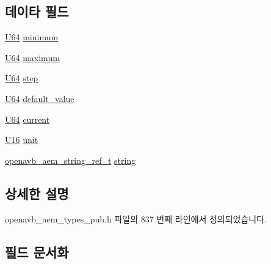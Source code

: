 \subsection*{데이타 필드}
\begin{DoxyCompactItemize}
\item 
\hyperlink{openavb__types__base__pub_8h_a25809e0734a149248fcf5831efa4e33d}{U64} \hyperlink{structopenavb__aem__control__value__format__control__linear__uint64__t_a6606c20ee2118944a8ad410a0dac9f76}{minimum}
\item 
\hyperlink{openavb__types__base__pub_8h_a25809e0734a149248fcf5831efa4e33d}{U64} \hyperlink{structopenavb__aem__control__value__format__control__linear__uint64__t_a8fe7f7213e1dad678ecc8a97fc7b7aaf}{maximum}
\item 
\hyperlink{openavb__types__base__pub_8h_a25809e0734a149248fcf5831efa4e33d}{U64} \hyperlink{structopenavb__aem__control__value__format__control__linear__uint64__t_a191ad24e14f917bbfd56d08146095b3e}{step}
\item 
\hyperlink{openavb__types__base__pub_8h_a25809e0734a149248fcf5831efa4e33d}{U64} \hyperlink{structopenavb__aem__control__value__format__control__linear__uint64__t_a96e5be7c2231237cbbf696065bd95114}{default\+\_\+value}
\item 
\hyperlink{openavb__types__base__pub_8h_a25809e0734a149248fcf5831efa4e33d}{U64} \hyperlink{structopenavb__aem__control__value__format__control__linear__uint64__t_a6a98e1d706da3b93a6adcf9420f33816}{current}
\item 
\hyperlink{openavb__types__base__pub_8h_a0a0a322d5fa4a546d293a77ba8b4a71f}{U16} \hyperlink{structopenavb__aem__control__value__format__control__linear__uint64__t_a0b3ff376c10369016824076deacc055e}{unit}
\item 
\hyperlink{structopenavb__aem__string__ref__t}{openavb\+\_\+aem\+\_\+string\+\_\+ref\+\_\+t} \hyperlink{structopenavb__aem__control__value__format__control__linear__uint64__t_a1f81001cefa769cb3651172fd5ab0748}{string}
\end{DoxyCompactItemize}


\subsection{상세한 설명}


openavb\+\_\+aem\+\_\+types\+\_\+pub.\+h 파일의 837 번째 라인에서 정의되었습니다.



\subsection{필드 문서화}
